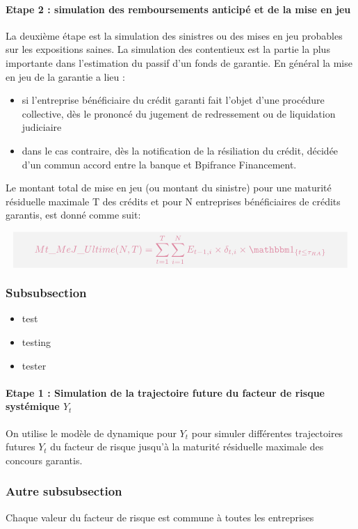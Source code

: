 \documentclass[12pt,a4paper]{report}
\begin{document}
\paragraph{Etape 2 : simulation des remboursements anticipé et de la mise en jeu}

La deuxième étape est la simulation des sinistres ou des mises en jeu probables sur les expositions saines. La simulation des contentieux est la partie la plus importante dans l’estimation du passif d’un fonds de garantie. 
En général la mise en jeu de la garantie  a lieu :
\begin{itemize}
	\item si l’entreprise bénéficiaire du crédit garanti fait l’objet d’une procédure collective, dès le prononcé du jugement de redressement ou de liquidation judiciaire
 	\item dans le cas contraire, dès la notification de la résiliation du crédit, décidée d’un commun accord entre la banque et Bpifrance Financement.
\end{itemize}
 
Le montant total de mise en jeu (ou montant du sinistre) pour une maturité résiduelle maximale T des crédits et pour N entreprises bénéficiaires de crédits garantis, est donné comme suit:

\[
\boxedb{
Mt\_MeJ\_Ultime(N,T) = \sum_{t=1}^T\sum_{i=1}^N E_{t-1,i}\times\delta_{t,i}\times\indic{t\leq \tau_{RA}}
}
\]



\subsubsection{Subsubsection}
\lipsum

\begin{itemize}
    \item test
    \item testing
\item tester
\end{itemize}

\paragraph{Etape 1 : Simulation de la trajectoire future du facteur de risque systémique $Y_t$}
On utilise le modèle de dynamique pour $Y_t$ pour simuler différentes trajectoires futures $Y_t$  du facteur de risque jusqu’à la maturité résiduelle maximale des concours garantis. 

\subsubsection{Autre subsubsection}
Chaque valeur du facteur de risque est commune à toutes les entreprises
\end{document}
